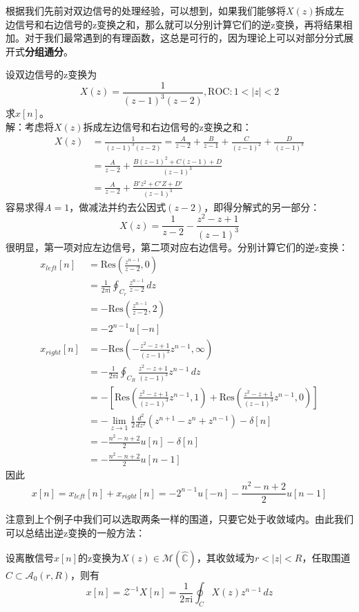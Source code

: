 根据我们先前对双边信号的处理经验，可以想到，如果我们能够将$X(z)$拆成左边信号和右边信号的z变换之和，那么就可以分别计算它们的逆z变换，再将结果相加。对于我们最常遇到的有理函数，这总是可行的，因为理论上可以对部分分式展开式\textbf{分组通分}。
\begin{example}
    设双边信号的z变换为
    \[X(z)=\frac{1}{(z-1)^3(z-2)},\text{ROC}:1<|z|<2\]
    求$x[n]$。\\
    解：考虑将$X(z)$拆成左边信号和右边信号的z变换之和：
    \begin{align*}
        X(z)&=\frac{1}{(z-1)^3(z-2)}=\frac{A}{z-2}+\frac{B}{z-1}+\frac{C}{(z-1)^2}+\frac{D}{(z-1)^3}\\
        &=\frac{A}{z-2}+\frac{B(z-1)^2+C(z-1)+D}{(z-1)^3}\\
        &=\frac{A}{z-2}+\frac{B'z^2+C'Z+D'}{(z-1)^3}
    \end{align*}
    容易求得$A=1$，做减法并约去公因式$(z-2)$，即得分解式的另一部分：
    \[X(z)=\frac{1}{z-2}-\frac{z^2-z+1}{(z-1)^3}\]
    很明显，第一项对应左边信号，第二项对应右边信号。分别计算它们的逆z变换：
    \begin{align*}
        x_{left}[n]&=\text{Res}\left(\frac{z^{n-1}}{z-2},0\right)\\
        &=\frac{1}{2\pi \mathrm{i}}\oint_{C_r}\frac{z^{n-1}}{z-2}\,dz\\
        &=-\text{Res}\left(\frac{z^{n-1}}{z-2},2\right)\\
        &=-2^{n-1}u[-n]\\
        x_{right}[n]&=-\text{Res}\left(-\frac{z^2-z+1}{(z-1)^3}z^{n-1},\infty\right)\\
        &=-\frac{1}{2\pi \mathrm{i}}\oint_{C_R}\frac{z^2-z+1}{(z-1)^3}z^{n-1}\,dz\\
        &=-\left[\text{Res}\left(\frac{z^2-z+1}{(z-1)^3}z^{n-1},1\right)+\text{Res}\left(\frac{z^2-z+1}{(z-1)^3}z^{n-1},0\right)\right]\\
        &=-\lim_{z\to 1}\frac{1}{2}\frac{d^2}{dz^2}\left(z^{n+1}-z^{n}+z^{n-1}\right)-\delta[n]\\
        &=-\frac{n^2-n+2}{2}u[n]-\delta[n]\\
        &=-\frac{n^2-n+2}{2}u[n-1]
    \end{align*}
    因此
    \[x[n]=x_{left}[n]+x_{right}[n]=-2^{n-1}u[-n]-\frac{n^2-n+2}{2}u[n-1]\]
\end{example}

注意到上个例子中我们可以选取两条一样的围道，只要它处于收敛域内。由此我们可以总结出逆z变换的一般方法：
\begin{theorem}
    设离散信号$x[n]$的z变换为$X(z)\in\mathcal{M} \left(\hat{\mathbb{C}}\right)$，其收敛域为$r<|z|<R$，任取围道$C\subset\mathcal{A} _0(r,R)$，则有
    \[x[n]=\mathcal{Z} ^{-1}X[n]=\frac{1}{2\pi \mathrm{i}}\oint_{C}X(z)z^{n-1}\,dz\]
\end{theorem}

